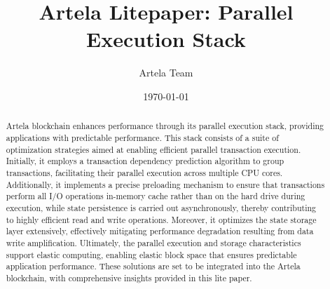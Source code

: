 \documentclass[twocolumn]{article}
\begin{document}
\small

\title{Artela Litepaper: Parallel Execution Stack}
\author{Artela Team}
\date{\today}


\maketitle

\begin{abstract}
    Artela blockchain enhances performance through its parallel execution stack, providing applications with predictable performance. This stack consists of a suite of optimization strategies aimed at enabling efficient parallel transaction execution. Initially, it employs a transaction dependency prediction algorithm to group transactions, facilitating their parallel execution across multiple CPU cores. Additionally, it implements a precise preloading mechanism to ensure that transactions perform all I/O operations in-memory cache rather than on the hard drive during execution, while state persistence is carried out asynchronously, thereby contributing to highly efficient read and write operations. Moreover, it optimizes the state storage layer extensively, effectively mitigating performance degradation resulting from data write amplification. Ultimately, the parallel execution and storage characteristics support elastic computing, enabling elastic block space that ensures predictable application performance. These solutions are set to be integrated into the Artela blockchain, with comprehensive insights provided in this lite paper.
\end{abstract}











 
\end{document}

